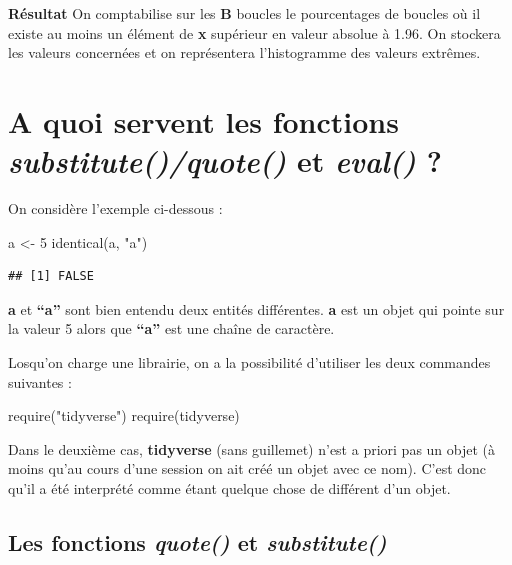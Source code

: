 \documentclass[
]{book}
\newenvironment{Shaded}{\begin{snugshade}}{\end{snugshade}}
\newcommand{\DecValTok}[1]{\textcolor[rgb]{0.00,0.00,0.81}{#1}}
\newcommand{\FunctionTok}[1]{\textcolor[rgb]{0.00,0.00,0.00}{#1}}
\newcommand{\NormalTok}[1]{#1}
\newcommand{\OtherTok}[1]{\textcolor[rgb]{0.56,0.35,0.01}{#1}}
\newcommand{\StringTok}[1]{\textcolor[rgb]{0.31,0.60,0.02}{#1}}
\theoremstyle{definition}
\theoremstyle{definition}
\theoremstyle{definition}
\theoremstyle{definition}
\theoremstyle{remark}
\begin{document}
\textbf{Résultat}
On comptabilise sur les \textbf{B} boucles le pourcentages de boucles où il existe au moins un élément de \textbf{x} supérieur en valeur absolue à 1.96. On stockera les valeurs concernées et on représentera l'histogramme des valeurs extrêmes.

\hypertarget{a-quoi-servent-les-fonctions-substitutequote-et-eval}{%
\section{\texorpdfstring{A quoi servent les fonctions \emph{substitute()/quote()} et \emph{eval()} ?}{A quoi servent les fonctions substitute()/quote() et eval() ?}}\label{a-quoi-servent-les-fonctions-substitutequote-et-eval}}

On considère l'exemple ci-dessous :

\begin{Shaded}
\begin{Highlighting}[]
\NormalTok{a }\OtherTok{\textless{}{-}} \DecValTok{5}
\FunctionTok{identical}\NormalTok{(a, }\StringTok{"a"}\NormalTok{) }
\end{Highlighting}
\end{Shaded}

\begin{verbatim}
## [1] FALSE
\end{verbatim}

\textbf{a} et \textbf{``a''} sont bien entendu deux entités différentes. \textbf{a} est un objet qui pointe sur la valeur 5 alors que \textbf{``a''} est une chaîne de caractère.

Losqu'on charge une librairie, on a la possibilité d'utiliser les deux commandes suivantes :

\begin{Shaded}
\begin{Highlighting}[]
\FunctionTok{require}\NormalTok{(}\StringTok{"tidyverse"}\NormalTok{)}
\FunctionTok{require}\NormalTok{(tidyverse)}
\end{Highlighting}
\end{Shaded}

Dans le deuxième cas, \textbf{tidyverse} (sans guillemet) n'est a priori pas un objet (à moins qu'au cours d'une session on ait créé un objet avec ce nom). C'est donc qu'il a été interprété comme étant quelque chose de différent d'un objet.

\hypertarget{les-fonctions-quote-et-substitute}{%
\subsection{\texorpdfstring{Les fonctions \emph{quote()} et \emph{substitute()}}{Les fonctions quote() et substitute()}}\label{les-fonctions-quote-et-substitute}}
\end{document}

